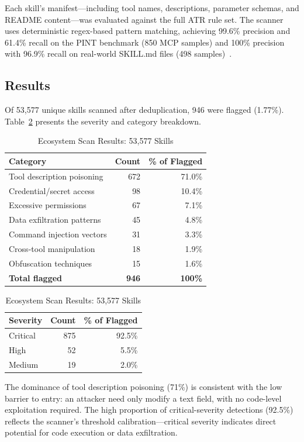 \documentclass[11pt,twocolumn]{article}
\begin{document}
Each skill's manifest---including tool names, descriptions, parameter schemas, and README content---was evaluated against the full ATR rule set. The scanner uses deterministic regex-based pattern matching, achieving 99.6\% precision and 61.4\% recall on the PINT benchmark (850 MCP samples) and 100\% precision with 96.9\% recall on real-world SKILL.md files (498 samples)~\cite{atr-benchmark}.

\subsection{Results}

Of 53,577 unique skills scanned after deduplication, 946 were flagged (1.77\%). Table~\ref{tab:scan-results} presents the severity and category breakdown.

\begin{table}[t]
\centering
\caption{Ecosystem Scan Results: 53,577 Skills}
\label{tab:scan-results}
\begin{tabular}{@{}lrr@{}}
\toprule
\textbf{Category} & \textbf{Count} & \textbf{\% of Flagged} \\
\midrule
Tool description poisoning & 672 & 71.0\% \\
Credential/secret access & 98 & 10.4\% \\
Excessive permissions & 67 & 7.1\% \\
Data exfiltration patterns & 45 & 4.8\% \\
Command injection vectors & 31 & 3.3\% \\
Cross-tool manipulation & 18 & 1.9\% \\
Obfuscation techniques & 15 & 1.6\% \\
\midrule
\textbf{Total flagged} & \textbf{946} & \textbf{100\%} \\
\bottomrule
\end{tabular}
\vspace{0.5em}

\begin{tabular}{@{}lrr@{}}
\toprule
\textbf{Severity} & \textbf{Count} & \textbf{\% of Flagged} \\
\midrule
Critical & 875 & 92.5\% \\
High & 52 & 5.5\% \\
Medium & 19 & 2.0\% \\
\bottomrule
\end{tabular}
\end{table}

The dominance of tool description poisoning (71\%) is consistent with the low barrier to entry: an attacker need only modify a text field, with no code-level exploitation required. The high proportion of critical-severity detections (92.5\%) reflects the scanner's threshold calibration---critical severity indicates direct potential for code execution or data exfiltration.
\end{document}
